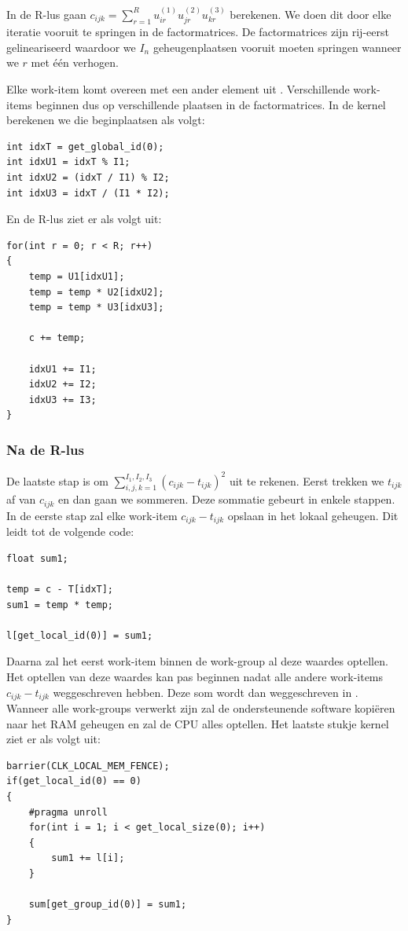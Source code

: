 In de R-lus gaan $c_{ijk} = \sum_{r=1}^{R} u^{(1)}_{i r} u^{(2)}_{j r} u^{(3)}_{k r}$ berekenen. We doen dit door elke iteratie vooruit te springen in de factormatrices. De factormatrices zijn rij-eerst gelineariseerd waardoor we $I_n$ geheugenplaatsen vooruit moeten springen wanneer we $r$ met \'e\'en verhogen.

Elke work-item komt overeen met een ander element uit \CC{}. Verschillende work-items beginnen dus op verschillende plaatsen in de factormatrices. In de kernel berekenen we die beginplaatsen als volgt:

\begin{lstlisting}
int idxT = get_global_id(0);
int idxU1 = idxT % I1;
int idxU2 = (idxT / I1) % I2;
int idxU3 = idxT / (I1 * I2);
\end{lstlisting}

En de R-lus ziet er als volgt uit:
\begin{lstlisting}
for(int r = 0; r < R; r++)
{
    temp = U1[idxU1];
    temp = temp * U2[idxU2];
    temp = temp * U3[idxU3];
    
    c += temp;
    
    idxU1 += I1;
    idxU2 += I2;
    idxU3 += I3;
}
\end{lstlisting}

\subsubsection{Na de R-lus}
\label{calcSum}
De laatste stap is om $\sum_{i,j,k = 1}^{I_1, I_2, I_3} \left(c_{ijk} - t_{ijk}\right)^2$ uit te rekenen. Eerst trekken we $t_{ijk}$ af van $c_{ijk}$ en dan gaan we sommeren. Deze sommatie gebeurt in enkele stappen. In de eerste stap zal elke work-item $c_{ijk} - t_{ijk}$ opslaan in het lokaal geheugen. Dit leidt tot de volgende code:
\begin{lstlisting}
float sum1;

temp = c - T[idxT];
sum1 = temp * temp;

l[get_local_id(0)] = sum1;
\end{lstlisting}

Daarna zal het eerst work-item binnen de work-group al deze waardes optellen. Het optellen van deze waardes kan pas beginnen nadat alle andere work-items $c_{ijk} - t_{ijk}$ weggeschreven hebben. Deze som wordt dan weggeschreven in . Wanneer alle work-groups verwerkt zijn zal de ondersteunende software  kopi\"eren naar het RAM geheugen en zal de CPU alles optellen. Het laatste stukje kernel ziet er als volgt uit:
\begin{lstlisting}
barrier(CLK_LOCAL_MEM_FENCE);
if(get_local_id(0) == 0)
{        
    #pragma unroll
    for(int i = 1; i < get_local_size(0); i++)
    {
        sum1 += l[i];
    }
    
    sum[get_group_id(0)] = sum1;
}
\end{lstlisting}

